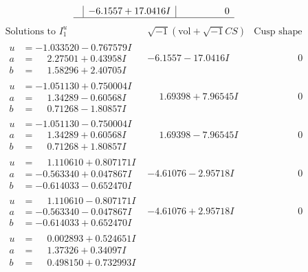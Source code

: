 \documentclass[1p]{elsarticle_modified}
\theoremstyle{definition}
\newcommand{\I}{\sqrt{-1}}
\begin{document}
$$\begin{array}{c|c|c}
 & -6.1557 + 17.0416 I & \phantom{-0.000000 } 0\\
 \hline 
 \end{array}$$\newpage$$\begin{array}{c|c|c}  
\text{Solutions to }I^u_{1}& \I (\text{vol} + \sqrt{-1}CS) & \text{Cusp shape}\\
 \hline 
\begin{aligned}
u &= -1.033520 - 0.767579 I \\
a &= \phantom{-}2.27501 + 0.43958 I \\
b &= \phantom{-}1.58296 + 2.40705 I\end{aligned}
 & -6.1557 - 17.0416 I & \phantom{-0.000000 } 0 \\ \hline\begin{aligned}
u &= -1.051130 + 0.750004 I \\
a &= \phantom{-}1.34289 - 0.60568 I \\
b &= \phantom{-}0.71268 - 1.80857 I\end{aligned}
 & \phantom{-}1.69398 + 7.96545 I & \phantom{-0.000000 } 0 \\ \hline\begin{aligned}
u &= -1.051130 - 0.750004 I \\
a &= \phantom{-}1.34289 + 0.60568 I \\
b &= \phantom{-}0.71268 + 1.80857 I\end{aligned}
 & \phantom{-}1.69398 - 7.96545 I & \phantom{-0.000000 } 0 \\ \hline\begin{aligned}
u &= \phantom{-}1.110610 + 0.807171 I \\
a &= -0.563340 + 0.047867 I \\
b &= -0.614033 - 0.652470 I\end{aligned}
 & -4.61076 - 2.95718 I & \phantom{-0.000000 } 0 \\ \hline\begin{aligned}
u &= \phantom{-}1.110610 - 0.807171 I \\
a &= -0.563340 - 0.047867 I \\
b &= -0.614033 + 0.652470 I\end{aligned}
 & -4.61076 + 2.95718 I & \phantom{-0.000000 } 0 \\ \hline\begin{aligned}
u &= \phantom{-}0.002893 + 0.524651 I \\
a &= \phantom{-}1.37326 + 0.34097 I \\
b &= \phantom{-}0.498150 + 0.732993 I\end{aligned}

\end{array}$$
\end{document}
